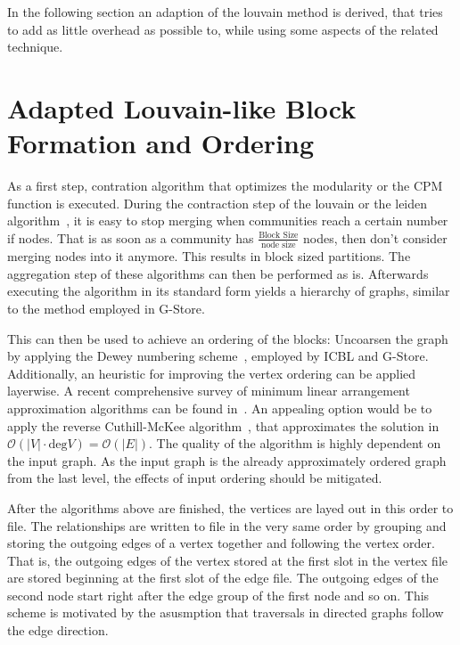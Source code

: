     In the following section an adaption of the louvain method is derived, that tries to add as little overhead as possible to, while using some aspects of the related technique.
    
    \section{Adapted Louvain-like Block Formation and Ordering}
        As a first step, contration algorithm that optimizes the modularity or the CPM~\autocite{traag2011narrow, potts1952some} function is executed.
        During the contraction step of the louvain or the leiden algorithm~\autocite{traag2019louvain}, it is easy to stop merging when communities reach a certain number if nodes.
        That is as soon as a community has $\frac{\text{Block Size}}{\text{node size}}$ nodes, then don't consider merging nodes into it anymore.
        This results in block sized partitions.
        The aggregation step of these algorithms can then be performed as is. 
        Afterwards executing the algorithm in its standard form yields a hierarchy of graphs, similar to the method employed in G-Store.
    
        This can then be used to achieve an ordering of the blocks:
        Uncoarsen the graph by applying the Dewey numbering scheme~\autocite{dewey1894decimal}, employed by ICBL and G-Store.
        Additionally, an heuristic for improving the vertex ordering can be applied layerwise. 
        A recent comprehensive survey of minimum linear arrangement approximation algorithms can be found in~\autocite{barik2020vertex}.
        An appealing option would be to apply the reverse Cuthill-McKee algorithm~\autocite{Cuthill1969ReducingTB}, that approximates the solution in $\mathcal{O}(|V| \cdot \text{deg}{V}) = \mathcal{O}(|E|)$. 
        The quality of the algorithm is highly dependent on the input graph.
        As the input graph is the already approximately ordered graph from the last level, the effects of input ordering should be mitigated.
        
        After the algorithms above are finished, the vertices are layed out in this order to file. 
        The relationships are written to file in the very same order by grouping and storing the outgoing edges of a vertex together and following the vertex order.
        That is, the outgoing edges of the vertex stored at the first slot in the vertex file are stored beginning at the first slot of the edge file. 
        The outgoing edges of the second node start right after the edge group of the first node and so on.
        This scheme is motivated by the asusmption that traversals in directed graphs follow the edge direction.
    
